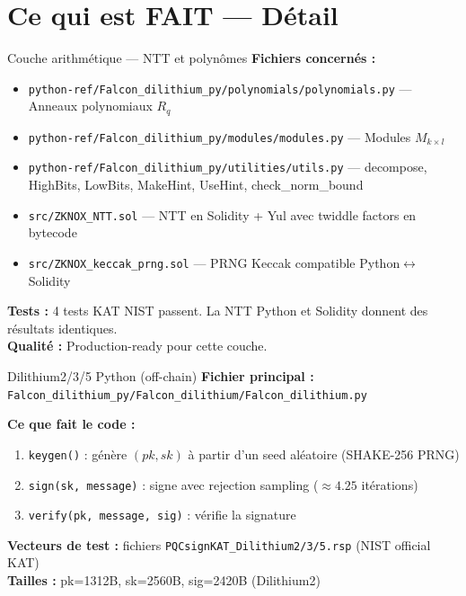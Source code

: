 \documentclass[12pt, a4paper]{article}
\begin{document}
\newpage
\section{Ce qui est FAIT --- Détail}

\begin{done}{Couche arithmétique --- NTT et polynômes}
\textbf{Fichiers concernés :}
\begin{itemize}
  \item \texttt{python-ref/Falcon\_dilithium\_py/polynomials/polynomials.py} --- Anneaux polynomiaux $R_q$
  \item \texttt{python-ref/Falcon\_dilithium\_py/modules/modules.py} --- Modules $M_{k \times l}$
  \item \texttt{python-ref/Falcon\_dilithium\_py/utilities/utils.py} --- decompose, HighBits, LowBits, MakeHint, UseHint, check\_norm\_bound
  \item \texttt{src/ZKNOX\_NTT.sol} --- NTT en Solidity + Yul avec twiddle factors en bytecode
  \item \texttt{src/ZKNOX\_keccak\_prng.sol} --- PRNG Keccak compatible Python$\leftrightarrow$Solidity

\end{itemize}
\textbf{Tests :} 4 tests KAT NIST passent. La NTT Python et Solidity donnent des résultats identiques.\\
\textbf{Qualité :} Production-ready pour cette couche.
\end{done}

\begin{done}{Dilithium2/3/5 Python (off-chain)}
\textbf{Fichier principal :} \texttt{Falcon\_dilithium\_py/Falcon\_dilithium/Falcon\_dilithium.py}

\textbf{Ce que fait le code :}
\begin{enumerate}
  \item \texttt{keygen()} : génère $(pk, sk)$ à partir d'un seed aléatoire (SHAKE-256 PRNG)
  \item \texttt{sign(sk, message)} : signe avec rejection sampling ($\approx 4.25$ itérations)
  \item \texttt{verify(pk, message, sig)} : vérifie la signature
\end{enumerate}

\textbf{Vecteurs de test :} fichiers \texttt{PQCsignKAT\_Dilithium2/3/5.rsp} (NIST official KAT)\\
\textbf{Tailles :} pk=1312B, sk=2560B, sig=2420B (Dilithium2)
\end{done}
\end{document}

